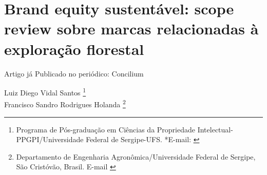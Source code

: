 \chapter{Brand equity sustentável: scope review sobre marcas relacionadas à exploração florestal}

Artigo já Publicado no periódico: Concilium \href{https://doi.org/10.53660/CLM-106-127B}{}


\begin{flushright}
Luiz Diego Vidal Santos  \footnote[1]{Programa de Pós-graduação em Ciências da Propriedade Intelectual-PPGPI/Universidade Federal de Sergipe-UFS. *E-mail:  \href{mailto:vidal.center@academico.ufs.br}{}}
\\[0.5cm] 
Francisco Sandro Rodrigues Holanda \footnote[2]{Departamento de Engenharia Agronômica/Universidade Federal de Sergipe, São Cristóvão, Brasil. E-mail \href{mailto:fholanda@infonet.com.br}{}}
\end{flushright}

